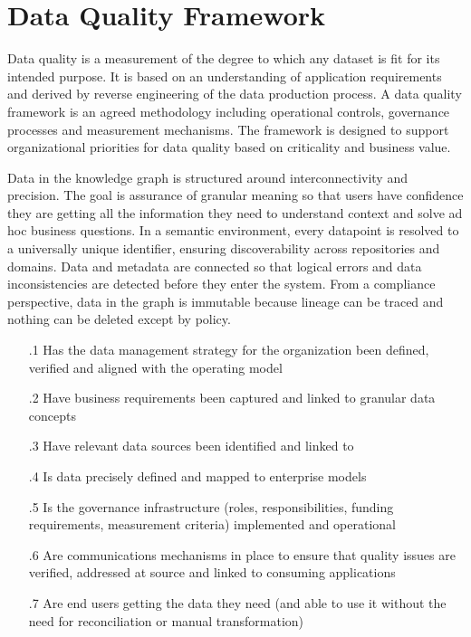 \section{Data Quality Framework}\label{sec:ekgmm-b-3-1} %

Data quality is a measurement of the degree to which any dataset is fit for its intended purpose.
It is based on an understanding of application requirements and derived by reverse engineering of the data production process.
A data quality framework is an agreed methodology including operational controls, governance processes and measurement mechanisms.
The framework is designed to support organizational priorities for data quality based on criticality and business value.

\kgmmekgrationalesection

Data in the knowledge graph is structured around interconnectivity and precision.
The goal is assurance of granular meaning so that users have confidence they are getting all the information they need to understand context and solve ad hoc business questions.
In a semantic environment, every datapoint is resolved to a universally unique identifier, ensuring discoverability across repositories and domains.
Data and metadata are connected so that logical errors and data inconsistencies are detected before they enter the system.
From a compliance perspective, data in the graph is immutable because lineage can be traced and nothing can be deleted except by policy.

\kgmmcorequestionssection

\begin{itemize}[leftmargin=.5in]
  \item [\thesection.1] Has the data management strategy for the organization been defined, verified and aligned with the operating model
  \item [\thesection.2] Have business requirements been captured and linked to granular data concepts
  \item [\thesection.3] Have relevant data sources been identified and linked to 
  \item [\thesection.4] Is data precisely defined and mapped to enterprise models
  \item [\thesection.5] Is the governance infrastructure (roles, responsibilities, funding requirements, measurement criteria) implemented and operational
  \item [\thesection.6] Are communications mechanisms in place to ensure that quality issues are verified, addressed at source and linked to consuming applications
  \item [\thesection.7] Are end users getting the data they need (and able to use it without the need for reconciliation or manual transformation)
\end{itemize}

